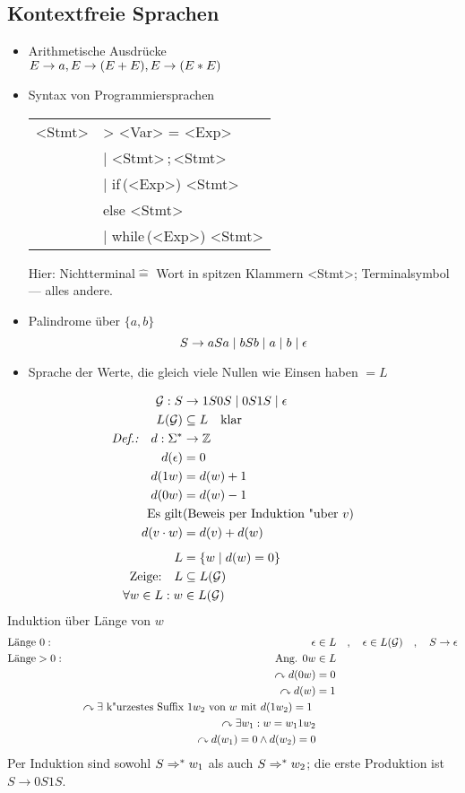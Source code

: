 \subsection{Kontextfreie Sprachen}
\begin{itemize}
\item Arithmetische Ausdrücke\\
	$E\->a,E\->(E+E),E\->(E*E)$
\item Syntax von Programmiersprachen%
	\begin{center}
		\begin{tabular}[t]{r@{ }l}
			<Stmt> &\-> <Var> = <Exp>\\
			&| <Stmt>\,;\,<Stmt>\\
			&| if\,(<Exp>) <Stmt>\\
			&\phantom{|} else <Stmt>\\
			&| while\,(<Exp>) <Stmt>
		\end{tabular}
	\end{center}%
	Hier: Nichtterminal$\hat=$ Wort in spitzen Klammern <Stmt>;
	Terminalsymbol --- alles andere.
\item Palindrome über $\{a,b\}$
	\[ S\-> aSa \mid bSb \mid a \mid b \mid \epsilon \]
\item Sprache der Werte, die gleich viele Nullen wie Einsen haben $=L$
\end{itemize}
\begin{align*}
	\mathcal{G}: S &\-> 1S0S \mid 0S1S \mid \epsilon\\
	L(\mathcal{G}) &\subseteq L \quad \text{klar}\\
	\emph{\text{Def.:}}\quad d:\Sigma^* &\-> \Z\\
	d(\epsilon) &= 0\\
	d(1w) &= d(w) + 1\\
	d(0w) &= d(w) - 1\\
	\text{Es gilt} & \text{(Beweis per Induktion "uber $v$)} \\
	d(v\cdot w) &= d(v)+d(w)\\[.5em]
	L &= \{ w \mid d(w)=0 \}\\
	\text{Zeige:}\quad L &\subseteq L(\mathcal{G})\\
	\forall w\in L : w&\in L(\mathcal{G})
\end{align*}
Induktion über Länge von $w$
\begin{alignat*}{2}
	&\text{Länge }0:\quad& \epsilon &\in L
		\quad,\quad \epsilon \in L(\mathcal{G})
		\quad,\quad S \-> \epsilon\\
	&\text{Länge}>0:\quad& \text{Ang. } 0w&\in L\\
	&&\curvearrowright d(0w) &= 0\\
	&&\curvearrowright d(w) &= 1 \\
	&&\curvearrowright \exists \text{ k"urzestes Suffix $1w_2$ von $w$ mit $d(1w_2)=1$ }\\
	&&\curvearrowright \exists w_1 : w=w_1 1 w_2\\
	&&\curvearrowright d(w_1)=0 \wedge d(w_2)=0
\end{alignat*}
Per Induktion sind sowohl $S \=>^*w_1$ als auch $S\=>^*w_2$; die erste Produktion ist
$S \to 0S1S$.

